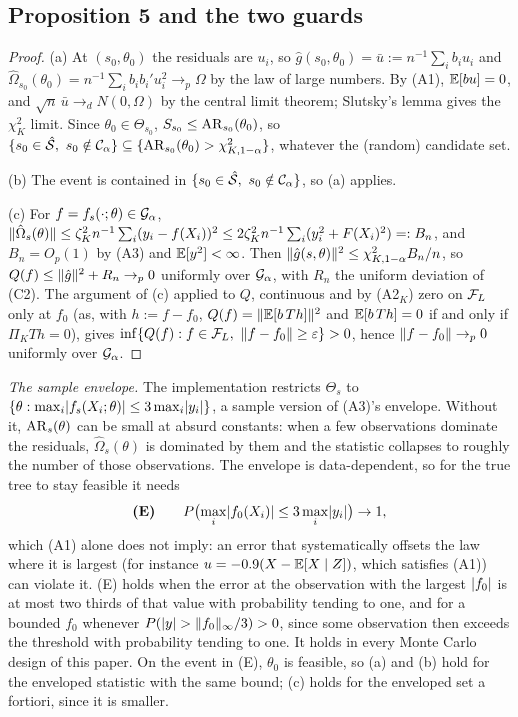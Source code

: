 \subsection{Proposition 5 and the two guards}
\label{app:prop5}

\begin{proof}
(a) At $(s_0, \theta_0)$ the residuals are $u_i$, so $\hat g(s_0,\theta_0) = \bar u := n^{-1}\sum_ib_iu_i$ and $\hat\Omega_{s_0}(\theta_0) = n^{-1}\sum_ib_ib_i'u_i^2 \to_p \Omega$ by the law of large numbers. By (A1), $\mathbb{E}[bu] = 0$, and $\sqrt n\,\bar u \to_d N(0, \Omega)$ by the central limit theorem; Slutsky's lemma gives the $\chi^2_K$ limit. Since $\theta_0 \in \Theta_{s_0}$, $S_{s_0} \le \mathrm{AR}_{s_0}(\theta_0)$, so $\{s_0 \in \hat{\mathcal{S}},\ s_0 \notin \mathcal{C}_\alpha\} \subseteq \{\mathrm{AR}_{s_0}(\theta_0) > \chi^2_{K,1-\alpha}\}$, whatever the (random) candidate set.

(b) The event is contained in $\{s_0 \in \hat{\mathcal{S}},\ s_0 \notin \mathcal{C}_\alpha\}$, so (a) applies.

(c) For $f = f_s(\cdot;\theta) \in \mathcal{G}_\alpha$, $\lVert \hat\Omega_s(\theta)\rVert \le \zeta_K^2n^{-1}\sum_i(y_i - f(X_i))^2 \le 2\zeta_K^2n^{-1}\sum_i(y_i^2 + F(X_i)^2) =: B_n$, and $B_n = O_p(1)$ by (A3) and $\mathbb{E}[y^2] < \infty$. Then $\lVert \hat g(s,\theta)\rVert^2 \le \chi^2_{K,1-\alpha}B_n/n$, so $Q(f) \le \lVert \hat g\rVert^2 + R_n \to_p 0$ uniformly over $\mathcal{G}_\alpha$, with $R_n$ the uniform deviation of (C2). The argument of (c) applied to $Q$, continuous and by (A2$_K$) zero on $\mathcal{F}_L$ only at $f_0$ (as, with $h := f - f_0$, $Q(f) = \lVert \mathbb{E}[b\,Th]\rVert^2$ and $\mathbb{E}[b\,Th] = 0$ if and only if $\Pi_KTh = 0$), gives $\inf\{Q(f) : f \in \mathcal{F}_L,\ \lVert f - f_0\rVert \ge \varepsilon\} > 0$, hence $\lVert f - f_0\rVert \to_p 0$ uniformly over $\mathcal{G}_\alpha$.
\end{proof}

\medskip\noindent\emph{The sample envelope.} The implementation restricts $\Theta_s$ to $\{\theta : \max_i\lvert f_s(X_i;\theta)\rvert \le 3\max_i\lvert y_i\rvert\}$, a sample version of (A3)'s envelope. Without it, $\mathrm{AR}_s(\theta)$ can be small at absurd constants: when a few observations dominate the residuals, $\hat\Omega_s(\theta)$ is dominated by them and the statistic collapses to roughly the number of those observations. The envelope is data-dependent, so for the true tree to stay feasible it needs
\[
\textbf{(E)}\qquad P\bigl(\max_i\lvert f_0(X_i)\rvert \le 3\max_i\lvert y_i\rvert\bigr) \to 1,
\]
which (A1) alone does not imply: an error that systematically offsets the law where it is largest (for instance $u = -0.9(X - \mathbb{E}[X \mid Z])$, which satisfies (A1)) can violate it. (E) holds when the error at the observation with the largest $\lvert f_0\rvert$ is at most two thirds of that value with probability tending to one, and for a bounded $f_0$ whenever $P(\lvert y\rvert > \lVert f_0\rVert_\infty/3) > 0$, since some observation then exceeds the threshold with probability tending to one. It holds in every Monte Carlo design of this paper. On the event in (E), $\theta_0$ is feasible, so (a) and (b) hold for the enveloped statistic with the same bound; (c) holds for the enveloped set a fortiori, since it is smaller.

